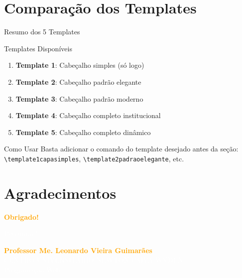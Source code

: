 \documentclass[aspectratio=169]{beamer}
\begin{document}

\section{Comparação dos Templates}

\begin{frame}{Resumo dos 5 Templates}
    \begin{block}{Templates Disponíveis}
        \begin{enumerate}
            \item \textbf{Template 1}: Cabeçalho simples (só logo)
            \item \textbf{Template 2}: Cabeçalho padrão elegante
            \item \textbf{Template 3}: Cabeçalho padrão moderno
            \item \textbf{Template 4}: Cabeçalho completo institucional
            \item \textbf{Template 5}: Cabeçalho completo dinâmico
        \end{enumerate}
    \end{block}
    
    \begin{alertblock}{Como Usar}
        Basta adicionar o comando do template desejado antes da seção:
        \texttt{\textbackslash template1capasimples}, \texttt{\textbackslash template2padraoelegante}, etc.
    \end{alertblock}
\end{frame}


\section{Agradecimentos}

\begin{frame}
    \begin{center}
        \Huge{\textcolor{orange}{\textbf{Obrigado!}}}
        \vspace{0.5cm}
        
        \newtonlogo[3cm]
        
        \vspace{0.5cm}
        \Large{\textcolor{white}{Perguntas?}}
        
        \vspace{1cm}
        \textcolor{orange}{\textbf{Professor Me. Leonardo Vieira Guimarães}}
        \\
        \textcolor{white}{CENTRO UNIVERSITÁRIO NEWTON PAIVA WYDEN}
        \\
        \textcolor{white}{\small Programação Web}
    \end{center}
\end{frame}
\end{document}
